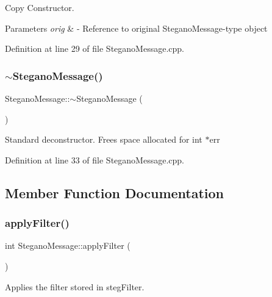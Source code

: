Copy Constructor. 


\begin{DoxyParams}{Parameters}
{\em orig} & -\/ Reference to original Stegano\+Message-\/type object \\
\hline
\end{DoxyParams}


Definition at line 29 of file Stegano\+Message.\+cpp.

\mbox{\label{classSteganoMessage_af60430fa53ebe9ee44e60d906b67059d}} 
\subsubsection{\texorpdfstring{$\sim$SteganoMessage()}{~SteganoMessage()}}
{\footnotesize\ttfamily Stegano\+Message\+::$\sim$\+Stegano\+Message (\begin{DoxyParamCaption}{ }\end{DoxyParamCaption})\hspace{0.3cm}{\ttfamily [virtual]}}

Standard deconstructor. Frees space allocated for int $\ast$err 

Definition at line 33 of file Stegano\+Message.\+cpp.



\subsection{Member Function Documentation}
\mbox{\label{classSteganoMessage_aec575d6949cf2eb49adefe2f1299d075}} 
\subsubsection{\texorpdfstring{applyFilter()}{applyFilter()}}
{\footnotesize\ttfamily int Stegano\+Message\+::apply\+Filter (\begin{DoxyParamCaption}{ }\end{DoxyParamCaption})}



Applies the filter stored in steg\+Filter. 

